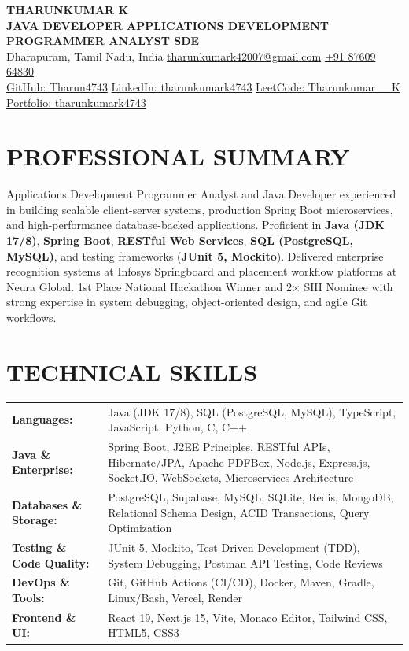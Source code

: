 \documentclass[a4paper,10pt]{article}
\begin{document}
\begin{center}
{\LARGE \textbf{THARUNKUMAR K}} \\[1.5pt]
{\small \textbf{JAVA DEVELOPER \textbar{} APPLICATIONS DEVELOPMENT PROGRAMMER ANALYST \textbar{} SDE}} \\[1.5pt]
Dharapuram, Tamil Nadu, India \textbar{} \href{mailto:tharunkumark42007@gmail.com}{tharunkumark42007@gmail.com} \textbar{} \href{tel:+918760964830}{+91 87609 64830} \\[1.5pt]
\href{https://github.com/Tharun4743}{GitHub: Tharun4743} \textbar{}
\href{https://linkedin.com/in/tharunkumark4743}{LinkedIn: tharunkumark4743} \textbar{}
\href{https://leetcode.com/u/Tharunkumar__K/}{LeetCode: Tharunkumar\_\_K} \textbar{}
\href{https://tharunkumark4743.netlify.app/}{Portfolio: tharunkumark4743}
\end{center}

\vspace{-4.5pt}

\section{PROFESSIONAL SUMMARY}
Applications Development Programmer Analyst and Java Developer experienced in building scalable client-server systems, production Spring Boot microservices, and high-performance database-backed applications. Proficient in \textbf{Java (JDK 17/8)}, \textbf{Spring Boot}, \textbf{RESTful Web Services}, \textbf{SQL (PostgreSQL, MySQL)}, and testing frameworks (\textbf{JUnit 5, Mockito}). Delivered enterprise recognition systems at Infosys Springboard and placement workflow platforms at Neura Global. 1st Place National Hackathon Winner and 2$\times$ SIH Nominee with strong expertise in system debugging, object-oriented design, and agile Git workflows.

\section{TECHNICAL SKILLS}
\begin{tabular}{@{}p{1.40in}p{6.05in}@{}}
\textbf{Languages:} & Java (JDK 17/8), SQL (PostgreSQL, MySQL), TypeScript, JavaScript, Python, C, C++ \\
\textbf{Java \& Enterprise:} & Spring Boot, J2EE Principles, RESTful APIs, Hibernate/JPA, Apache PDFBox, Node.js, Express.js, Socket.IO, WebSockets, Microservices Architecture \\
\textbf{Databases \& Storage:} & PostgreSQL, Supabase, MySQL, SQLite, Redis, MongoDB, Relational Schema Design, ACID Transactions, Query Optimization \\
\textbf{Testing \& Code Quality:} & JUnit 5, Mockito, Test-Driven Development (TDD), System Debugging, Postman API Testing, Code Reviews \\
\textbf{DevOps \& Tools:} & Git, GitHub Actions (CI/CD), Docker, Maven, Gradle, Linux/Bash, Vercel, Render \\
\textbf{Frontend \& UI:} & React 19, Next.js 15, Vite, Monaco Editor, Tailwind CSS, HTML5, CSS3 \\
\end{tabular}
\end{document}
